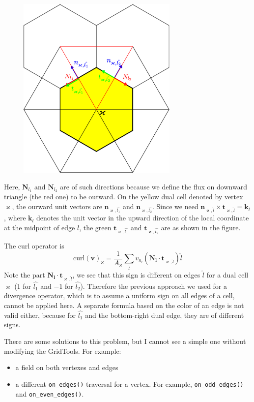 \documentclass[12pt]{article}
\begin{document}
  \begin{figure}[htbp]
  \centering
  \includegraphics[width=0.7\textwidth]{dual_sign.eps}
  \end{figure}

Here, $\bm{N}_{l_1}$ and $\bm{N}_{l_2}$ are of such directions because we define the flux on downward triangle (the red one) to be outward.
On the yellow dual cell denoted by vertex $\varkappa$, the ourward unit vectors are $\bm{n}_{\varkappa, \hat{l_1}}$ and $\bm{n}_{\varkappa, \hat{l_2}}$.
Since we need $\bm{n}_{\varkappa, \hat{l}} \times \bm{t}_{\varkappa, \hat{l}}=\bm{k}_l$, where $\bm{k}_l$ denotes the unit vector in the upward direction of the local coordinate at the midpoint of edge $l$, the green $\bm{t}_{\varkappa, \hat{l_1}}$ and $\bm{t}_{\varkappa, \hat{l_2}}$ are as shown in the figure.

The curl operator is
\[\text{curl}(\bm{v})_{\varkappa} = \frac{1}{A_\varkappa}\sum\limits_{\hat{l}}v_{n_l}(\bm{N_l}\cdot\bm{t}_{\varkappa, \hat{l}})\hat{l}\]
Note the part $\bm{N_l}\cdot\bm{t}_{\varkappa, \hat{l}}$, we see that this sign is different on edges $\hat{l}$ for a dual cell $\varkappa$ ($1$ for $\hat{l_1}$ and $-1$ for $\hat{l_2}$). Therefore the previous approach we used for a divergence operator, which is to assume a uniform sign on all edges of a cell, cannot be applied here. A separate formula based on the color of an edge is not valid either, because for $\hat{l_1}$ and the bottom-right dual edge, they are of different signs.


There are some solutions to this problem, but I cannot see a simple one without modifying the GridTools. For example:
\begin{itemize}
  \item a field on both vertexes and edges
  \item a different \texttt{on\_edges()} traversal for a vertex. For example, \texttt{on\_odd\_edges()} and \texttt{on\_even\_edges()}.
\end{itemize}
\end{document}
